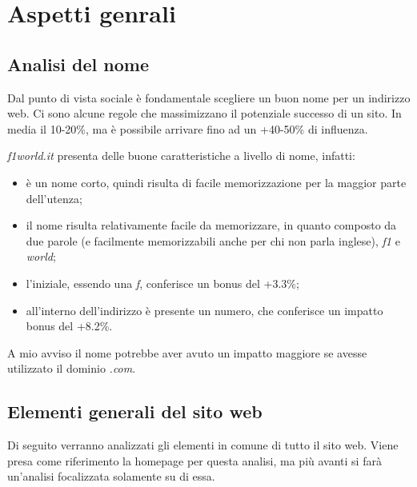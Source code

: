 \section{Aspetti genrali}

\subsection{Analisi del nome}
Dal punto di vista sociale \`e fondamentale scegliere un buon nome per un
indirizzo web. Ci sono alcune regole che massimizzano il potenziale successo di
un sito. In media il 10-20\%, ma \`e possibile arrivare fino ad un +40-50\%
di influenza.

\textit{f1world.it} presenta delle buone caratteristiche a livello di nome,
infatti:
\begin{itemize}

\item \`e un nome corto, quindi risulta di facile memorizzazione per la maggior
  parte dell'utenza;
\item il nome risulta relativamente facile da memorizzare, in quanto composto
  da due parole (e facilmente memorizzabili anche per chi non parla inglese),
  \textit{f1} e \textit{world};
\item l'iniziale, essendo una \textit{f}, conferisce un bonus del +3.3\%;
\item all'interno dell'indirizzo \`e presente un numero, che conferisce un
  impatto bonus del +8.2\%.
\end{itemize}

A mio avviso il nome potrebbe aver avuto un impatto maggiore se avesse
utilizzato il dominio \textit{.com}.


\subsection{Elementi generali del sito web}

Di seguito verranno analizzati gli elementi in comune di tutto il sito web.
Viene presa come riferimento la homepage per questa analisi, ma pi\`u avanti
si far\`a un'analisi focalizzata solamente su di essa.

